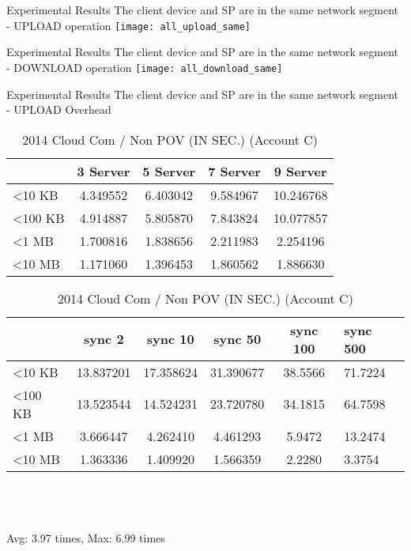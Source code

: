 \begin{frame}{Experimental Results}
{The client device and SP are in the same network segment - UPLOAD operation}
	\texttt{[image: all\_upload\_same]}
\end{frame}

\begin{frame}{Experimental Results}
{The client device and SP are in the same network segment - DOWNLOAD operation}
	\texttt{[image: all\_download\_same]}
\end{frame}

\begin{frame}{Experimental Results}
{The client device and SP are in the same network segment - UPLOAD Overhead}
	\scriptsize
    \begin{table}[]
    \centering
    \caption{My Method / Non POV (IN SEC.) (Account C)}
    \begin{tabular}{lcccc}
                         & 3 Server & 5 Server & 7 Server & 9 Server  \\ \hline
        \textless 10 KB  & 4.349552 & 6.403042 & 9.584967 & 10.246768 \\ \hline
        \textless 100 KB & 4.914887 & 5.805870 & 7.843824 & 10.077857 \\ \hline
        \textless 1 MB   & 1.700816 & 1.838656 & 2.211983 & 2.254196  \\ \hline
        \textless 10 MB  & 1.171060 & 1.396453 & 1.860562 & 1.886630  \\ \hline
    \end{tabular}
    \caption{2014 Cloud Com / Non POV (IN SEC.) (Account C)}
    \begin{tabular}{lccccl}
                         & sync 2    & sync 10   & sync 50   & sync 100 & sync 500 \\ \hline
        \textless 10 KB  & 13.837201 & 17.358624 & 31.390677 & 38.5566  & 71.7224  \\ \hline
        \textless 100 KB & 13.523544 & 14.524231 & 23.720780 & 34.1815  & 64.7598  \\ \hline
        \textless 1 MB   & 3.666447  & 4.262410  & 4.461293  & 5.9472   & 13.2474  \\ \hline
        \textless 10 MB  & 1.363336  & 1.409920  & 1.566359  & 2.2280   & 3.3754   \\ \hline
    \end{tabular}
    ~\\
    ~\\
    ~\\
    \alert{Avg: 3.97 times, Max: 6.99 times}
    \end{table}
\end{frame}

